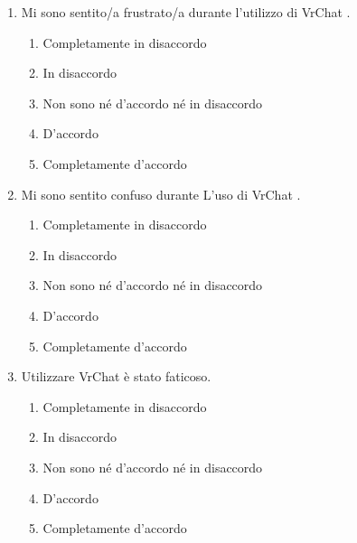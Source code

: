 \documentclass{article}
\newcommand{\app}{VrChat \hspace{0.1em}}
\begin{document}
\begin{enumerate}[label=\textbf{Domanda \arabic*.}, resume]
    \item Mi sono sentito/a frustrato/a durante l’utilizzo di \app.
    \begin{enumerate}
    \item Completamente in disaccordo
    \item In disaccordo
    \item Non sono né d’accordo né in disaccordo
    \item D’accordo
    \item Completamente d’accordo
\end{enumerate}
    \item Mi sono sentito confuso durante L'uso di \app.
    \begin{enumerate}
    \item Completamente in disaccordo
    \item In disaccordo
    \item Non sono né d’accordo né in disaccordo
    \item D’accordo
    \item Completamente d’accordo
\end{enumerate}
    \item Utilizzare \app è stato faticoso.
    \begin{enumerate}
    \item Completamente in disaccordo
    \item In disaccordo
    \item Non sono né d’accordo né in disaccordo
    \item D’accordo
    \item Completamente d’accordo
\end{enumerate}
\end{enumerate}
\end{document}
